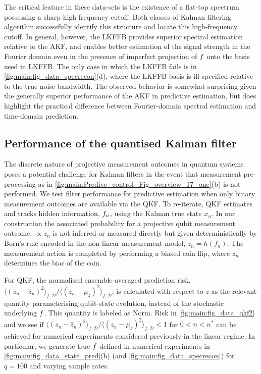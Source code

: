 The critical feature in these data-sets is the existence of a flat-top spectrum possessing a sharp high frequency cutoff.  Both classes of Kalman filtering algorithm successfully identify this structure and locate this high-frequency cutoff.  In general, however, the LKFFB provides superior spectral estimation relative to the AKF, and enables better estimation of the signal strength in the Fourier domain even in the presence of imperfect projection of $f$ onto the basis used in LKFFB.  The only case in which the LKFFB fails is in \cref{fig:main:fig_data_specrecon}(d), where the LKFFB basis is ill-specified relative to the true noise bandwidth. The observed behavior is somewhat surprising given the generally superior performance of the AKF in predictive estimation, but does highlight the practical difference between Fourier-domain spectral estimation and time-domain prediction.  %


\subsection{Performance of the quantised Kalman filter}
The discrete nature of projective measurement outcomes in quantum systems poses a potential challenge for Kalman filters in the event that measurement pre-processing as in \cref{fig:main:Predive_control_Fig_overview_17_one}(b) is not performed.  We test filter performance for predictive estimation when only binary measurement outcomes are available via the QKF.  To re-iterate, QKF estimates and tracks hidden information, $f_n$, using the Kalman true state $x_n$.  In our construction the associated probability for a projective qubit measurement outcome, $\propto z_n$ is not inferred or measured directly but given deterministically by Born's rule encoded in the non-linear measurement model, $z_n = h(f_n)$. The measurement action is completed by performing a biased coin flip, where $z_n$ determines the bias of the coin.  

For QKF, the normalised ensemble-averaged prediction risk, $ \langle (z_n - \hat{z}_n)^2 \rangle_{f, \mathcal{D}} / \langle (z_n - \mu_z)^2 \rangle_{f, \mathcal{D}}$, is calculated with respect to $z$ as the relevant quantity parameterising qubit-state evolution, instead of the stochastic underlying $f$. This quantity is labeled as Norm. Risk in \cref{fig:main:fig_data_qkf2} and we see if $ \langle (z_n - \hat{z}_n)^2 \rangle_{f, \mathcal{D}} / \langle (z_n - \mu_z)^2 \rangle_{f, \mathcal{D}} < 1$ for $0< n < n^*$ can be achieved for numerical experiments considered previously in the linear regime. In particular, we generate true $f$ defined in numerical experiments in \cref{fig:main:fig_data_state_pred}(b) (and \cref{fig:main:fig_data_specrecon}) for $q=100$ and varying sample rates.

